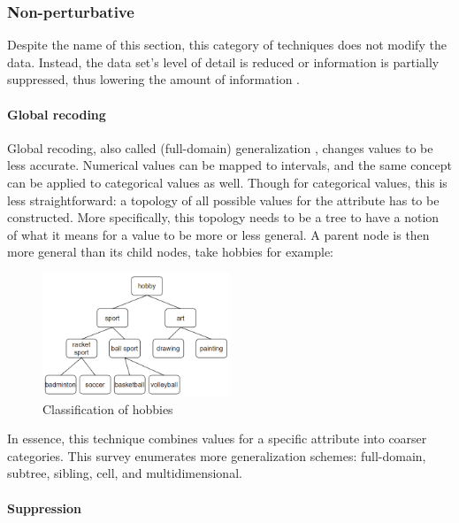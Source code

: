     \subsubsection{Non-perturbative}

    Despite the name of this section, this category of techniques does not modify the data.
    Instead, the data set's level of detail is reduced or information is partially suppressed, thus lowering the amount of information \cite{Lu2021}.

        \paragraph{Global recoding}
        \label{s:GlobalRecoding}

        Global recoding, also called (full-domain) generalization \cite{Fung2010, Lu2021}, changes values to be less accurate.
        Numerical values can be mapped to intervals, and the same concept can be applied to categorical values as well.
        Though for categorical values, this is less straightforward: 
        a topology of all possible values for the attribute has to be constructed.
        More specifically, this topology needs to be a tree to have a notion of what it means for a value to be more or less general.
        A parent node is then more general than its child nodes, take hobbies for example:
        

        \begin{figure}[h!]
        \centering
        \includegraphics[width=0.5\textwidth]{figures/decision-tree.png}
        \caption{Classification of hobbies}
        \label{fig:hobbies}
        \end{figure}

        
        In essence, this technique combines values for a specific attribute into coarser categories.
        This survey \cite{Fung2010} enumerates more generalization schemes: full-domain, subtree, sibling, cell, and multidimensional.

        \paragraph{Suppression}
        \label{s:Supression}

